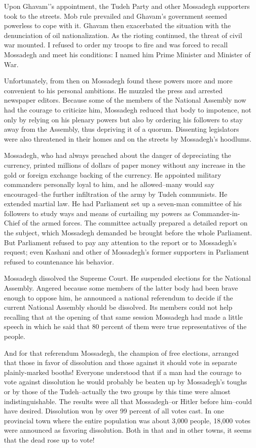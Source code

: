 Upon Ghavam’'s appointment, the Tudeh Party and other Mossadegh supporters took to the streets. Mob rule prevailed and Ghavam's government seemed powerless to cope with it. Ghavam then exacerbated the situation with the denunciation of oil nationalization. As the rioting continued, the threat of civil war mounted. I refused to order my troops to fire and was forced to recall Mossadegh and meet his conditions: I named him Prime Minister and Minister of War. 

Unfortunately, from then on Mossadegh found these powers more and more convenient to his personal ambitions. He muzzled the press and arrested newspaper editors. Because some of the members of the National Assembly now had the courage to criticize him, Mossadegh reduced that body to impotence, not only by relying on his plenary powers but also by ordering his followers to stay away from the Assembly, thus depriving it of a quorum. Dissenting legislators were also threatened in their homes and on the streets by Mossadegh’s hoodlums. 

Mossadegh, who had always preached about the danger of depreciating the currency, printed millions of dollars of paper money without any increase in the gold or foreign exchange backing of the currency. He appointed military commanders personally loyal to him, and he allowed--many would say encouraged--the further infiltration of the army by Tudeh communists. He extended martial law. He had Parliament set up a seven-man committee of his followers to study ways and means of curtailing my powers as Commander-in-Chief of the armed forces. The committee actually prepared a detailed report on the subject, which Mossadegh demanded be brought before the whole Parliament. But Parliament refused to pay any attention to the report or to Mossadegh's request; even Kashani and other of Mossadegh’s former supporters in Parliament refused to countenance his behavior. 

Mossadegh dissolved the Supreme Court. He suspended elections for the National Assembly. Angered because some members of the latter body had been brave enough to oppose him, he announced a national referendum to decide if the current National Assembly should be dissolved. Its members could not help recalling that at the opening of that same session Mossadegh had made a little speech in which he said that 80 percent of them were true representatives of the people. 

And for that referendum Mossadegh, the champion of free elections, arranged that those in favor of dissolution and those against it should vote in separate plainly-marked booths! Everyone understood that if a man had the courage to vote against dissolution he would probably be beaten up by Mossadegh’s toughs or by those of the Tudeh--actually the two groups by this time were almost indistinguishable. The results were all that Mossadegh--or Hitler before him--could have desired. Dissolution won by over 99 percent of all votes cast. In one provincial town where the entire population was about 3,000 people, 18,000 votes were announced as favoring dissolution. Both in that and in other towns, it seems that the dead rose up to vote! 

